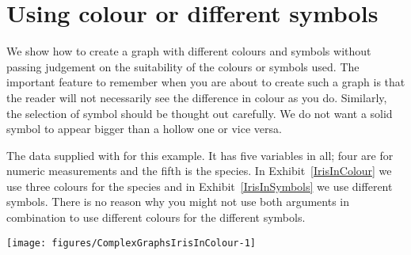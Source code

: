 \section{Using colour or different symbols} 
 
We show how to create a graph with different colours and symbols without passing judgement on the suitability of the colours or symbols used. The important feature to remember when you are about to create such a graph is that the reader will not necessarily see the difference in colour as you do. Similarly, the selection of symbol should be thought out carefully. We do not want a solid symbol to appear bigger than a hollow one or vice versa. 
 
The  data supplied with \R{} for this example. It has five variables in all; four are for numeric measurements and the fifth is the species. In Exhibit~\ref{IrisInColour} we use three colours for the species and in Exhibit~\ref{IrisInSymbols} we use different symbols. There is no reason why you might not use both arguments in combination to use different colours for the different symbols. 
 
\begin{exhibit} 
\begin{center} 
\caption{} 
\label{IrisInColour} 
\begin{knitrout}
\color{fgcolor}\begin{kframe}
\begin{alltt}
\hlstd{> }\hlopt{~}  \hlstd{=}\hlstd{,} \hlstd{=}\hlstd{,} 
\end{alltt}
\end{kframe}
\texttt{[image: figures/ComplexGraphsIrisInColour-1]} 

\end{knitrout}
\end{center} 
\end{exhibit} 
 
